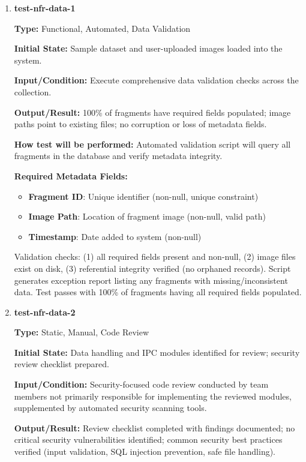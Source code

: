 \documentclass[12pt, titlepage]{article}
\begin{document}
\begin{enumerate}

\item \textbf{test-nfr-data-1}

\textbf{Type:} Functional, Automated, Data Validation
					
\textbf{Initial State:} Sample dataset and user-uploaded images loaded into the system.
					
\textbf{Input/Condition:} Execute comprehensive data validation checks across the collection.
					
\textbf{Output/Result:} 100\% of fragments have required fields populated; image paths point to existing files; no corruption or loss of metadata fields.
					
\textbf{How test will be performed:} Automated validation script will query all fragments in the database and verify metadata integrity.

\textbf{Required Metadata Fields:}
\begin{itemize}
\item \textbf{Fragment ID}: Unique identifier (non-null, unique constraint)
\item \textbf{Image Path}: Location of fragment image (non-null, valid path)
\item \textbf{Timestamp}: Date added to system (non-null)
\end{itemize}

Validation checks: (1) all required fields present and non-null, (2) image files exist on disk, (3) referential integrity verified (no orphaned records). Script generates exception report listing any fragments with missing/inconsistent data. Test passes with 100\% of fragments having all required fields populated.

\item \textbf{test-nfr-data-2}

\textbf{Type:} Static, Manual, Code Review

\textbf{Initial State:} Data handling and IPC modules identified for review; security review checklist prepared.

\textbf{Input/Condition:} Security-focused code review conducted by team members not primarily responsible for implementing the reviewed modules, supplemented by automated security scanning tools.

\textbf{Output/Result:} Review checklist completed with findings documented; no critical security vulnerabilities identified; common security best practices verified (input validation, SQL injection prevention, safe file handling).


\end{enumerate}
\end{document}
